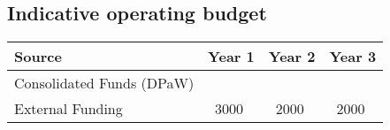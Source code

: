 \documentclass[version=last,
    paper=a4, %
    10pt, %
    usenames,
    dvipsnames,
    oneside, %
    headings=openany, %
    DIV=15 %
]{scrbook}
\begin{document}
\subsection*{Indicative operating budget }



\begin{longtabu} to \linewidth { |  X | X | X | X | }
\hline
{}
Source & Year 1 & Year 2 & Year 3\\
\hline
\endhead



Consolidated Funds (DPaW) &  &  & \\



External Funding & ~3000 & ~2000 & ~2000\\


\hline
\end{longtabu}






\end{document}
